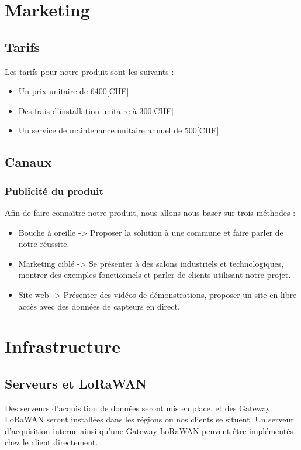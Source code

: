 \section{Marketing}
\subsection{Tarifs}
Les tarifs pour notre produit sont les suivants :
\begin{itemize}
    \item Un prix unitaire de 6400[CHF]
    \item Des frais d'installation unitaire à 300[CHF]
    \item Un service de maintenance unitaire annuel de 500[CHF]
\end{itemize}

\subsection{Canaux}
\subsubsection{Publicité du produit}
Afin de faire connaître notre produit, nous allons nous baser sur trois
méthodes :
\begin{itemize}
    \item Bouche à oreille -> Proposer la solution à une commune
    et faire parler de notre réussite.
    \item Marketing ciblé -> Se présenter à des salons industriels
    et technologiques, montrer des exemples fonctionnels et parler de
    clients utilisant notre projet.
    \item Site web -> Présenter des vidéos de démonstrations,
    proposer un site en libre accès avec des données de capteurs en direct.
\end{itemize}

\section{Infrastructure}
\subsection{Serveurs et LoRaWAN}
Des serveurs d'acquisition de données seront mis en place,
et des Gateway LoRaWAN seront installées dans les régions ou nos
clients se situent.
Un serveur d'acquisition interne ainsi qu'une Gateway LoRaWAN
peuvent être implémentés chez le client directement.

